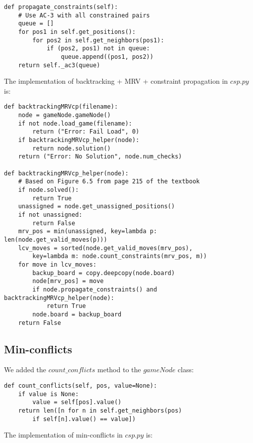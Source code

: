 \documentclass[11pt]{article}
\begin{document}
\lstset{language=Python}
\begin{lstlisting}[frame=single]
def propagate_constraints(self):
	# Use AC-3 with all constrained pairs
	queue = []
	for pos1 in self.get_positions():
		for pos2 in self.get_neighbors(pos1):
			if (pos2, pos1) not in queue:
				queue.append((pos1, pos2))
	return self._ac3(queue)

\end{lstlisting}

The implementation of backtracking + MRV + constraint propagation in $csp.py$ is:

\lstset{language=Python}
\begin{lstlisting}[frame=single]
def backtrackingMRVcp(filename):
	node = gameNode.gameNode()
	if not node.load_game(filename):
		return ("Error: Fail Load", 0)
	if backtrackingMRVcp_helper(node):
		return node.solution()
	return ("Error: No Solution", node.num_checks)

def backtrackingMRVcp_helper(node):
	# Based on Figure 6.5 from page 215 of the textbook
	if node.solved():
		return True
	unassigned = node.get_unassigned_positions()
	if not unassigned:
		return False
	mrv_pos = min(unassigned, key=lambda p: len(node.get_valid_moves(p)))
	lcv_moves = sorted(node.get_valid_moves(mrv_pos),
		key=lambda m: node.count_constraints(mrv_pos, m))
	for move in lcv_moves:
		backup_board = copy.deepcopy(node.board)
		node[mrv_pos] = move
		if node.propagate_constraints() and backtrackingMRVcp_helper(node):
			return True
		node.board = backup_board
	return False
\end{lstlisting}

\subsection{Min-conflicts}

We added the $count\_conflicts$ method to the $gameNode$ class:

\lstset{language=Python}
\begin{lstlisting}[frame=single]
def count_conflicts(self, pos, value=None):
	if value is None:
		value = self[pos].value()
	return len([n for n in self.get_neighbors(pos)
		if self[n].value() == value])
\end{lstlisting}

The implementation of min-conflicts in $csp.py$ is:
\end{document}
